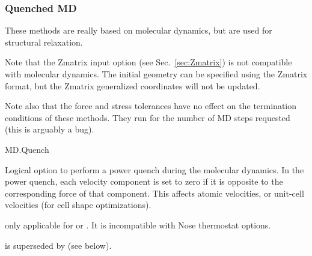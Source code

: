 \ifdeprecated

\subsubsection{Quenched MD}

These methods are really based on molecular dynamics, but are used for
structural relaxation.

Note that the Zmatrix input option (see Sec.~\ref{sec:Zmatrix}) is not
compatible with molecular dynamics. The initial geometry can be
specified using the Zmatrix format, but the Zmatrix generalized
coordinates will not be updated.

Note also that the force and stress tolerances have no effect on
the termination conditions of these methods. They run for the number
of MD steps requested (this is arguably a bug).

\begin{fdflogicalF}{MD.Quench}

  Logical option to perform a power quench during the molecular
  dynamics.  In the power quench, each velocity component is set to
  zero if it is opposite to the corresponding force of that
  component. This affects atomic velocities, or unit-cell velocities
  (for cell shape optimizations).

  \note only applicable for  or
  .
  It is incompatible with Nose thermostat options.  

  \note {} is superseded by  (see
  below).

\end{fdflogicalF}


